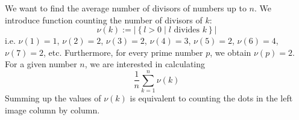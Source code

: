 \begin{example}\label{ex:average_number_of_divisors}
We want to find the average number of divisors of numbers up to $n$.
We introduce function counting the number of divisors of $k$:
\[
\nu(k) := \left|\left\{l > 0 \mid l\text{ divides }k\right\}\right|
\]
i.e. \(\nu(1) = 1\), \(\nu(2) = 2\), \(\nu(3) = 2\), \(\nu(4) = 3\), \(\nu(5) = 2\), \(\nu(6) = 4\), \(\nu(7) = 2\), etc.
Furthermore, for every prime number \(p\), we obtain \(\nu(p) = 2\).
For a given number \(n\), we are interested in calculating
\[
\frac{1}{n}\sum_{k=1}^{n} \nu(k)
\]
Summing up the values of $\nu(k)$ is equivalent to counting the dots in the left image column by column. 

\begin{figure}[ht]
\centering
\begin{subfigure}[t]{0.49\textwidth}
\centering
{}
\end{subfigure}
\begin{subfigure}[t]{0.49\textwidth}
\centering
{}
\end{subfigure}
\end{figure}
\end{example}
